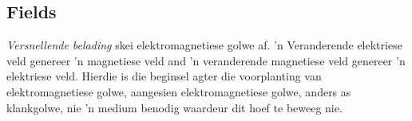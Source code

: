 \label{m38777*secfhsst!!!underscore!!!id79}

            \subsection*{Fields}
            \nopagebreak
      \label{m38777*id187125}\textit{Versnellende belading} skei elektromagnetiese golwe af. 'n Veranderende elektriese veld genereer 'n magnetiese veld and 'n veranderende magnetiese veld genereer 'n elektriese veld. Hierdie is die beginsel agter die voorplanting van elektromagnetiese golwe, aangesien elektromagnetiese golwe, anders as klankgolwe, nie 'n medium benodig waardeur dit hoef te beweeg nie.  

